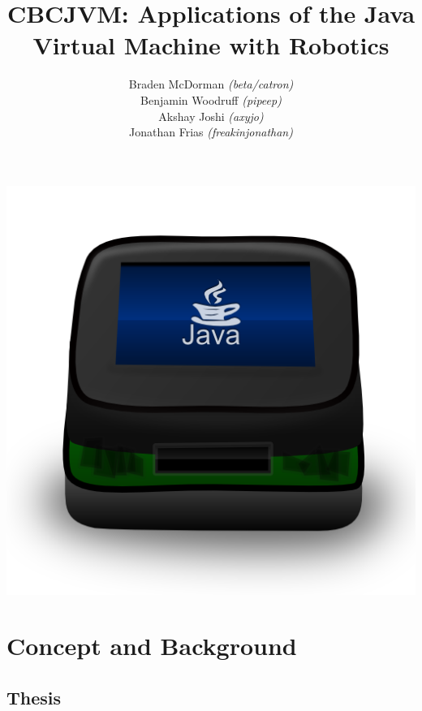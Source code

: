\documentclass[12pt,letterpaper]{article}
\title{CBCJVM: Applications of the Java Virtual Machine with Robotics}
\author{Braden McDorman \textit{(beta/catron)}\\
Benjamin Woodruff \textit{(pipeep)}\\
Akshay Joshi \textit{(axyjo)}\\
Jonathan Frias \textit{(freakinjonathan)}}
\begin{document}
\makeatletter
\noindent\begin{minipage}[l]{.8\textwidth}\begin{flushleft}\begin{small}
\textbf{\@title}\vspace{.75em}

\@author\vspace{.5em}

\authInfo
\end{small}\end{flushleft}\end{minipage}\vspace{.25in}
\begin{center}
\begin{Large}
\textbf{\@title}
\end{Large}
\par\includegraphics[height=.5in]{CBCJava.png}
\end{center}
\makeatother

\section{Concept and Background}

\subsection{Thesis}
\end{document}
